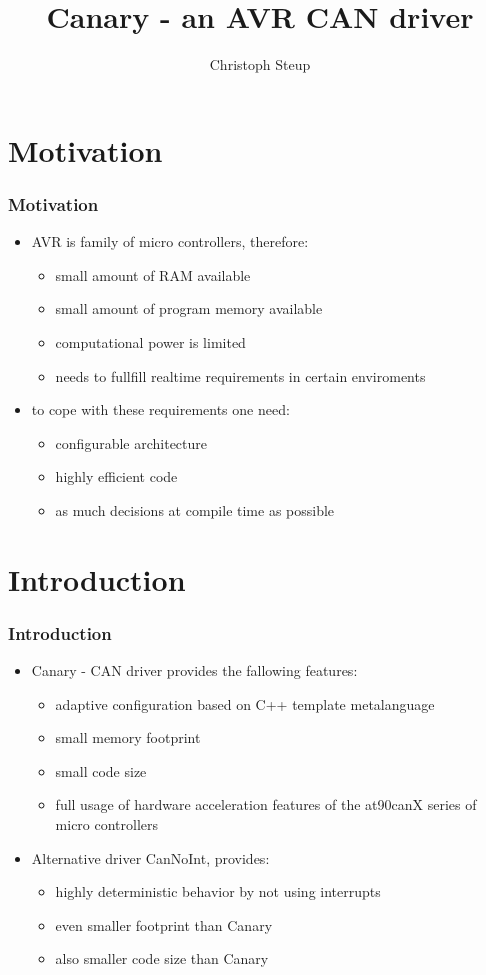 \documentclass{beamer}
\title[AVR CAN driver]{Canary - an AVR CAN driver}
\author{Christoph Steup}
\institute{EOS - IVS at FIN - OvGU}
\begin{document}
\frame{\titlepage}

\section{Motivation}
\begin{frame}
	\frametitle{Motivation}
	\begin{itemize}
		\item AVR is family of micro controllers, therefore:
		\begin{itemize}
			\item small amount of RAM available
			\item small amount of program memory available
			\item computational power is limited
			\item needs to fullfill realtime requirements in certain enviroments
		\end{itemize}
		\item to cope with these requirements one need:
			\begin{itemize}
				\item configurable architecture
				\item highly efficient code
				\item as much decisions at compile time as possible
			\end{itemize}
	\end{itemize}
\end{frame}

\section{Introduction}
\begin{frame}
	\frametitle{Introduction}
	\begin{itemize}
		\item Canary - CAN driver provides the fallowing features:
		\begin{itemize}
			\item adaptive configuration based on C++ template metalanguage
			\item small memory footprint
			\item small code size
			\item full usage of hardware acceleration features of the at90canX\cite{at90canX} series of micro controllers
		\end{itemize}
		\item Alternative driver CanNoInt, provides:
		\begin{itemize}
			\item highly deterministic behavior by not using interrupts
			\item even smaller footprint than Canary
			\item also smaller code size than Canary
		\end{itemize}
	\end{itemize}
\end{frame}
\end{document}
